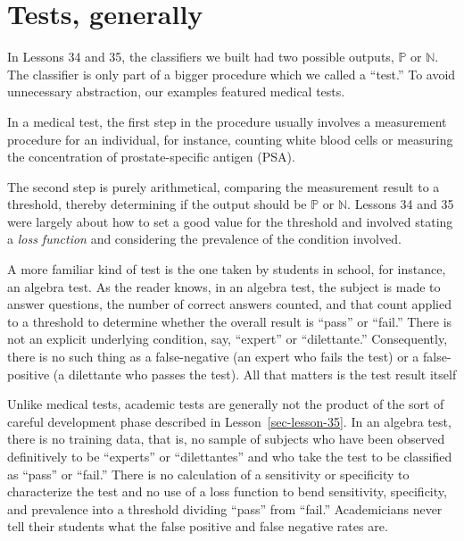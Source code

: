 \documentclass[
  letterpaper,
  DIV=11,
  numbers=noendperiod,
  oneside]{scrreprt}
\begin{document}
\hypertarget{tests-generally}{%
\section{Tests, generally}\label{tests-generally}}

In Lessons 34 and 35, the classifiers we built had two possible outputs,
\({\mathbb{P}}\) or \({\mathbb{N}}\). The classifier is only part of a
bigger procedure which we called a ``test.'' To avoid unnecessary
abstraction, our examples featured medical
tests.{}

In a medical test, the first step in the procedure usually involves a
measurement procedure for an individual, for instance, counting white
blood cells or measuring the concentration of prostate-specific antigen
(PSA).

The second step is purely arithmetical, comparing the measurement result
to a threshold, thereby determining if the output should be
\({\mathbb{P}}\) or \({\mathbb{N}}\). Lessons 34 and 35 were largely
about how to set a good value for the threshold and involved stating a
\emph{loss function} and considering the prevalence of the condition
involved.

A more familiar kind of test is the one taken by students in school, for
instance, an algebra test. As the reader knows, in an algebra test, the
subject is made to answer questions, the number of correct answers
counted, and that count applied to a threshold to determine whether the
overall result is ``pass'' or ``fail.'' There is not an explicit
underlying condition, say, ``expert'' or ``dilettante.'' Consequently,
there is no such thing as a false-negative (an expert who fails the
test) or a false-positive (a dilettante who passes the test). All that
matters is the test result itself

Unlike medical tests, academic tests are generally not the product of
the sort of careful development phase described in
Lesson~\ref{sec-lesson-35}. In an algebra test, there is no training
data, that is, no sample of subjects who have been observed definitively
to be ``experts'' or ``dilettantes'' and who take the test to be
classified as ``pass'' or ``fail.'' There is no calculation of a
sensitivity or specificity to characterize the test and no use of a loss
function to bend sensitivity, specificity, and prevalence into a
threshold dividing ``pass'' from ``fail.'' Academicians never tell their
students what the false positive and false negative rates are.
\end{document}

